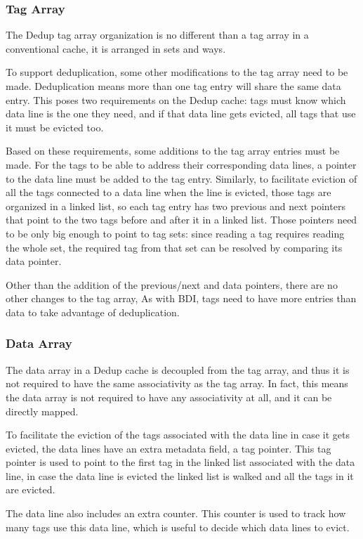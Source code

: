 \subsubsection{Tag Array}
\label{sssec:DedupTag}
The Dedup tag array organization is no different than a tag array in a conventional cache, it is arranged in sets and ways.\par
To support deduplication, some other modifications to the tag array need to be made. Deduplication means more than one tag entry will share the same data entry. This poses two requirements on the Dedup cache: tags must know which data line is the one they need, and if that data line gets evicted, all tags that use it must be evicted too.\par
Based on these requirements, some additions to the tag array entries must be made. For the tags to be able to address their corresponding data lines, a pointer to the data line must be added to the tag entry. Similarly, to facilitate eviction of all the tags connected to a data line when the line is evicted, those tags are organized in a linked list, so each tag entry has two previous and next pointers that point to the two tags before and after it in a linked list. Those pointers need to be only big enough to point to tag sets: since reading a tag requires reading the whole set, the required tag from that set can be resolved by comparing its data pointer.\par
Other than the addition of the previous/next and data pointers, there are no other changes to the tag array, As with BDI, tags need to have more entries than data to take advantage of deduplication.
\subsubsection{Data Array}
\label{sssec:DedupData}
The data array in a Dedup cache is decoupled from the tag array, and thus it is not required to have the same associativity as the tag array. In fact, this means the data array is not required to have any associativity at all, and it can be directly mapped.\par
To facilitate the eviction of the tags associated with the data line in case it gets evicted, the data lines have an extra metadata field, a tag pointer. This tag pointer is used to point to the first tag in the linked list associated with the data line, in case the data line is evicted the linked list is walked and all the tags in it are evicted.\par
The data line also includes an extra counter. This counter is used to track how many tags use this data line, which is useful to decide which data lines to evict.
